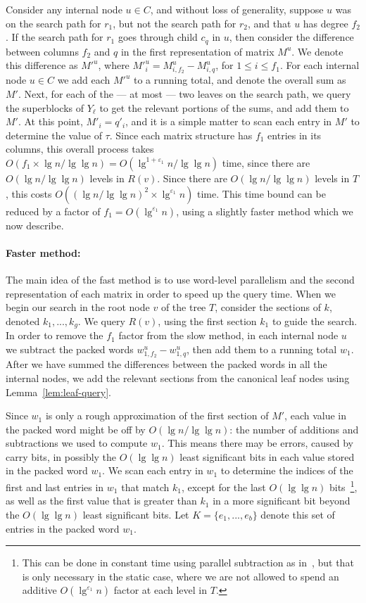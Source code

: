 \documentclass{llncs}
\begin{document}
Consider any internal node $u \in C$, and without loss of generality,
suppose $u$ was on the search path for $r_1$, but not the search path
for $r_2$, and that $u$ has degree $f_2$.  If the search path for
$r_1$ goes through child $c_q$ in $u$, then consider the difference
between columns $f_2$ and $q$ in the first representation of matrix
$M^u$.  We denote this difference as $M'^u$, where $M'^u_i =
M^u_{i,f_2} - M^{u}_{i,q}$, for $1 \le i \le f_1$.  For each internal
node $u \in C$ we add each $M'^u$ to a running total, and denote the
overall sum as $M'$.  Next, for each of the --- at most --- two leaves
on the search path, we query the superblocks of $Y_\ell$ to get the
relevant portions of the sums, and add them to $M'$.  At this point,
$M'_i = q'_i$, and it is a simple matter to scan each entry in $M'$ to
determine the value of $\tau$.  Since each matrix structure has $f_1$
entries in its columns, this overall process takes $O(f_1 \times \lg n
/ \lg \lg n) = O(\lg^{1+\varepsilon_1}n / \lg \lg n)$ time, since
there are $O(\lg n / \lg \lg n)$ levels in $R(v)$.  Since there are
$O(\lg n / \lg \lg n)$ levels in $T$, this costs $O((\lg n / \lg \lg
n)^2 \times \lg^{\varepsilon_1}n)$ time.  This time bound can be
reduced by a factor of $f_1 = O(\lg^{\varepsilon_1}n)$, using
a slightly faster method which we now describe.

\paragraph{Faster method:} The main idea of the fast method is to use
word-level parallelism and the second representation of each matrix in
order to speed up the query time.  When we begin our search in the
root node $v$ of the tree $T$, consider the sections of $k$, denoted
$k_1, ..., k_{g}$.  We query $R(v)$, using the first section $k_1$ to
guide the search.  In order to remove the $f_1$ factor from the slow
method, in each internal node $u$ we subtract the packed words
$w^u_{1,f_2} - w^u_{1,q}$, then add them to a running total $w_1$.
After we have summed the differences between the packed words in all
the internal nodes, we add the relevant sections from the canonical
leaf nodes using Lemma~\ref{lem:leaf-query}.

Since $w_1$ is only a rough approximation of the first section of
$M'$, each value in the packed word might be off by $O(\lg n / \lg \lg
n)$: the number of additions and subtractions we used to compute
$w_1$.  This means there may be errors, caused by carry bits, in
possibly the $O(\lg \lg n)$ least significant bits in each value
stored in the packed word $w_1$.  We scan each entry in $w_1$ to
determine the indices of the first and last entries in $w_1$ that
match $k_1$, except for the last $O(\lg \lg n)$ bits~\footnote{This
  can be done in constant time using parallel subtraction as
  in~\cite{BGJS10}, but that is only necessary in the static case,
  where we are not allowed to spend an additive $O(\lg^{\varepsilon_1}
  n)$ factor at each level in $T$.}, as well as the first value that
is greater than $k_1$ in a more significant bit beyond the $O(\lg \lg
n)$ least significant bits.  Let $K = \{ e_1, ..., e_{b} \}$ denote
this set of entries in the packed word $w_1$.
\end{document}
